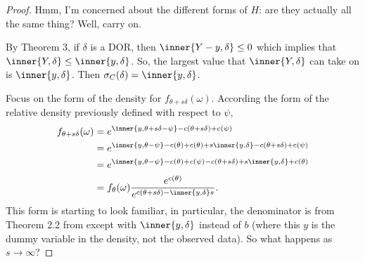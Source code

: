 \begin{proof}
Hmm, I'm concerned about the different forms of $H$: are they actually all the same 
thing?  Well, carry on.

By Theorem 3, if $\delta$ is a DOR, then $\inner{Y-y, \delta} \leq 0$ which implies 
that $\inner{Y, \delta} \leq \inner{y, \delta}$.  So, the largest value that $\inner
{Y, \delta}$ can take on is $\inner{y, \delta}$.  Then $\sigma_C(\delta) = \inner{y, 
\delta}$.

Focus on the form of the density for $f_{\theta+s\delta}(\omega)$.  According the 
form of the relative density previously defined with respect to $\psi$,
\begin{align*}
 f_{\theta+s\delta}(\omega) &= e^{ \inner{y,\theta+s\delta - \psi} - c(\theta+s
\delta) + c(\psi)  } \\
 	&= e^{ \inner{y,\theta - \psi} -c(\theta) + c(\theta) + s \inner{y,\delta} - c
(\theta+s\delta) + c(\psi)  } \\
 	&= e^{ \inner{y,\theta - \psi} -c(\theta) + c(\psi) - c(\theta+s\delta) + s 
\inner{y,\delta} + c(\theta)   } \\
 	&= f_\theta(\omega) \frac{e^{c(\theta)}}{e^{ c(\theta+s\delta) - \inner{y,\delta}
s } }.
\end{align*}
This form is starting to look familiar, in particular, the denominator is from 
Theorem 2.2 from \citet{Geyer:1990} except with $\inner{y,\delta}$ instead of $b$ 
(where this 
$y$ is the dummy variable in the density, not the observed data).  So what happens as 
$s \to \infty$?  


\end{proof}
